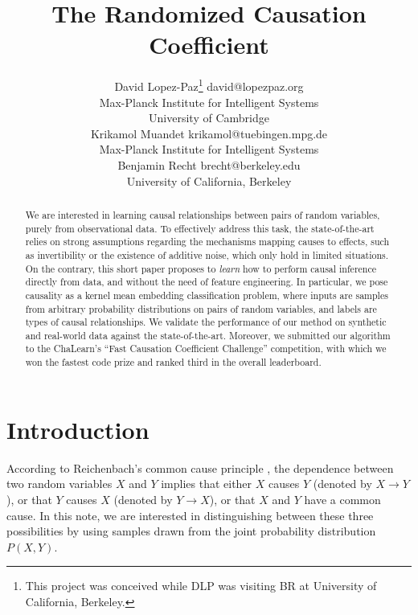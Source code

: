 \documentclass[twoside,11pt,a4paper]{article}
\begin{document}
 

\title{The Randomized Causation Coefficient}

\author{\name David Lopez-Paz\thanks{This project was conceived while DLP was
visiting BR at University of California, Berkeley.} \email david@lopezpaz.org
\\
        \addr Max-Planck Institute for Intelligent Systems\\
        \addr University of Cambridge\\
        \name Krikamol Muandet \email krikamol@tuebingen.mpg.de \\
        \addr Max-Planck Institute for Intelligent Systems\\
        \name Benjamin Recht  \email brecht@berkeley.edu\\
        \addr University of California, Berkeley\\
}

\maketitle

\begin{abstract}%
  We are interested in learning causal relationships between pairs of random
  variables, purely from observational data. To effectively address this task,
  the state-of-the-art relies on strong assumptions regarding the mechanisms
  mapping causes to effects, such as invertibility or the existence of additive
  noise, which only hold in limited situations.
  On the contrary, this short paper proposes to \emph{learn} how to perform
  causal inference directly from data, and without the need of feature
  engineering. In particular, we pose causality as a kernel mean embedding
  classification problem, where inputs are samples from arbitrary probability
  distributions on pairs of random variables, and labels are types of causal
  relationships.
  We validate the performance of our method on synthetic and real-world data
  against the state-of-the-art. Moreover, we submitted our algorithm to the
  ChaLearn's ``Fast Causation Coefficient Challenge'' competition, with which
  we won the fastest code prize and ranked third in the overall leaderboard.
\end{abstract}

\section{Introduction}\label{sec:intro}
According to Reichenbach's common cause principle \citep{Reichenbach56:Time},
the dependence between two random variables $X$ and $Y$ implies that either $X$
causes $Y$ (denoted by $X \rightarrow Y$), or that $Y$ causes $X$ (denoted by
$Y \rightarrow X$), or that $X$ and $Y$ have a common cause. In this note, we
are interested in distinguishing between these three possibilities by using
samples drawn from the joint probability distribution $P(X,Y)$.
\end{document}
